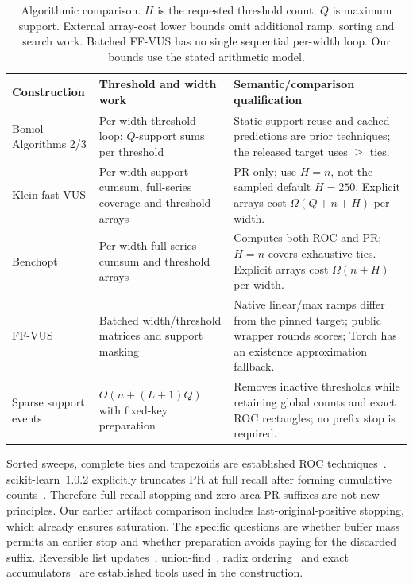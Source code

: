 \begin{table}[t]
\centering\small
\setlength{\tabcolsep}{4pt}
\begin{tabular}{p{}p{}p{}}
\toprule
Construction & Threshold and width work & Semantic/comparison qualification\\
\midrule
Boniol Algorithms 2/3 & Per-width threshold loop; $Q$-support sums per threshold & Static-support reuse and cached predictions are prior techniques; the released target uses $\ge$ ties.\\
Klein fast-VUS & Per-width support cumsum, full-series coverage and threshold arrays & PR only; use $H=n$, not the sampled default $H=250$. Explicit arrays cost $\Omega(Q+n+H)$ per width.\\
Benchopt & Per-width full-series cumsum and threshold arrays & Computes both ROC and PR; $H=n$ covers exhaustive ties. Explicit arrays cost $\Omega(n+H)$ per width.\\
FF-VUS & Batched width/threshold matrices and support masking & Native linear/max ramps differ from the pinned target; public wrapper rounds scores; Torch has an existence approximation fallback.\\
Sparse support events & $O(n+(L+1)Q)$ with fixed-key preparation & Removes inactive thresholds while retaining global counts and exact ROC rectangles; no prefix stop is required.\\
\bottomrule
\end{tabular}
\caption{Algorithmic comparison. $H$ is the requested threshold count;
$Q$ is maximum support. External array-cost lower bounds omit
additional ramp, sorting and search work. Batched FF-VUS has no single
sequential per-width loop. Our bounds use the stated arithmetic model.}
\label{tab:algorithm-scope}
\end{table}

Sorted sweeps, complete ties and trapezoids are established ROC
techniques~\cite{fawcett2006}. scikit-learn~1.0.2 explicitly truncates PR at
full recall after forming cumulative counts~\cite{sklearn102}. Therefore
full-recall stopping and zero-area PR suffixes are not new principles.
Our earlier artifact comparison includes last-original-positive stopping, which already
ensures saturation. The specific questions are whether buffer mass permits
an earlier stop and whether preparation avoids paying for the discarded
suffix. Reversible list updates~\cite{knuth2000}, union-find~\cite{tarjan1984},
radix ordering~\cite{demaine2011radix,herf2001radix} and exact
accumulators~\cite{neal2015} are established tools used in the construction.

